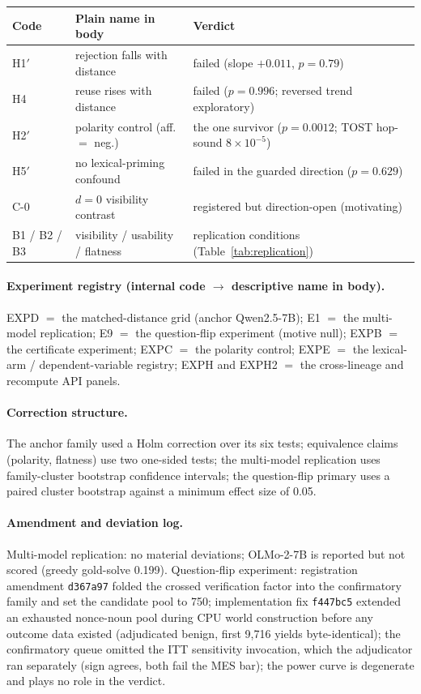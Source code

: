 \begin{table}[h]
\centering
\small
\begin{tabular}{@{}lll@{}}
\toprule
Code & Plain name in body & Verdict \\
\midrule
H1$'$ & rejection falls with distance & failed (slope $+0.011$, $p{=}0.79$) \\
H4 & reuse rises with distance & failed ($p{=}0.996$; reversed trend exploratory) \\
H2$'$ & polarity control (aff.\ $=$ neg.) & the one survivor ($p{=}0.0012$; TOST hop-sound $8{\times}10^{-5}$) \\
H5$'$ & no lexical-priming confound & failed in the guarded direction ($p{=}0.629$) \\
C-0 & $d{=}0$ visibility contrast & registered but direction-open (motivating) \\
B1 / B2 / B3 & visibility / usability / flatness & replication conditions (Table~\ref{tab:replication}) \\
\bottomrule
\end{tabular}
\end{table}

\paragraph{Experiment registry (internal code $\rightarrow$ descriptive name
in body).} EXPD $=$ the matched-distance grid (anchor Qwen2.5-7B); E1 $=$ the
multi-model replication; E9 $=$ the question-flip experiment (motive null);
EXPB $=$ the certificate experiment; EXPC $=$ the polarity control; EXPE $=$
the lexical-arm / dependent-variable registry; EXPH and EXPH2 $=$ the
cross-lineage and recompute API panels.

\paragraph{Correction structure.} The anchor family used a Holm correction
over its six tests; equivalence claims (polarity, flatness) use two
one-sided tests; the multi-model replication uses family-cluster bootstrap
confidence intervals; the question-flip primary uses a paired cluster
bootstrap against a minimum effect size of 0.05.

\paragraph{Amendment and deviation log.} Multi-model replication: no material
deviations; OLMo-2-7B is reported but not scored (greedy gold-solve 0.199).
Question-flip experiment: registration amendment \texttt{d367a97} folded the
crossed verification factor into the confirmatory family and set the
candidate pool to 750; implementation fix \texttt{f447bc5} extended an
exhausted nonce-noun pool during CPU world construction before any outcome
data existed (adjudicated benign, first 9{,}716 yields byte-identical); the
confirmatory queue omitted the ITT sensitivity invocation, which the
adjudicator ran separately (sign agrees, both fail the MES bar); the power
curve is degenerate and plays no role in the verdict.

